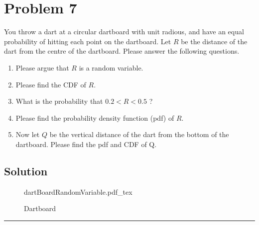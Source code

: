 \section{Problem 7}
You throw a dart at a circular dartboard with unit radious, and have an equal probability of hitting each point on the dartboard. Let $R$ be the distance of the dart from the centre of the dartboard. Please answer the following questions.

\begin{enumerate}[7a.]
	\item Please argue that $R$ is a random variable.
	\item Please find the CDF of $R$.
	\item What is the probability that $0.2<R<0.5$ ?
	\item Please find the probability density function (pdf) of $R$.
	\item Now let $Q$ be the vertical distance of the dart from the bottom of the dartboard. Please find the pdf and CDF of Q.
\end{enumerate}
\subsection{Solution}

\begin{figure}[H]
	\centering
	\begin{adjustbox}{max width=\textwidth}
		{dartBoardRandomVariable.pdf_tex}
	\end{adjustbox}
	\caption{Dartboard}
	\label{fig:dartBoardRandomVariable}
\end{figure}

\noindent\rule{\textwidth}{1pt}
